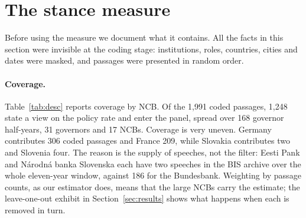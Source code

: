 \documentclass[11pt]{article}
\theoremstyle{plain}
\begin{document}
\section{The stance measure}\label{sec:measure}

Before using the measure we document what it contains. All the facts in this section were invisible at the coding stage: institutions, roles, countries, cities and dates were masked, and passages were presented in random order.

\paragraph{Coverage.}
Table~\ref{tab:desc} reports coverage by NCB. Of the 1{,}991 coded passages, 1{,}248 state a view on the policy rate and enter the panel, spread over 168 governor half-years, 31 governors and 17 NCBs. Coverage is very uneven. Germany contributes 306 coded passages and France 209, while Slovakia contributes two and Slovenia four. The reason is the supply of speeches, not the filter: Eesti Pank and N\'arodn\'a banka Slovenska each have two speeches in the BIS archive over the whole eleven-year window, against 186 for the Bundesbank. Weighting by passage counts, as our estimator does, means that the large NCBs carry the estimate; the leave-one-out exhibit in Section~\ref{sec:results} shows what happens when each is removed in turn.
\end{document}
